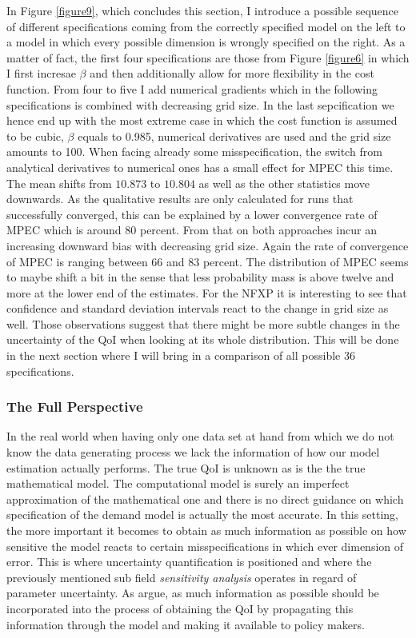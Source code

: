 In Figure \ref{figure9}, which concludes this section, I introduce a possible sequence of different specifications coming from the correctly specified model on the left to a model in which every possible dimension is wrongly specified on the right. As a matter of fact, the first four specifications are those from Figure \ref{figure6} in which I first incresae $\beta$ and then additionally allow for more flexibility in the cost function. From four to five I add numerical gradients which in the following specifications is combined with decreasing grid size. In the last sepcification we hence end up with the most extreme case in which the cost function is assumed to be cubic, $\beta$ equals to 0.985, numerical derivatives are used and the grid size amounts to 100. When facing already some misspecification, the switch from analytical derivatives to numerical ones has a small effect for MPEC this time. The mean shifts from $10.873$ to $10.804$ as well as the other statistics move downwards. As the qualitative results are only calculated for runs that successfully converged, this can be explained by a lower convergence rate of MPEC which is around 80 percent. From that on both approaches incur an increasing downward bias with decreasing grid size. Again the rate of convergence of MPEC is ranging between 66 and 83 percent. The distribution of MPEC seems to maybe shift a bit in the sense that less probability mass is above twelve and more at the lower end of the estimates. For the NFXP it is interesting to see that confidence and standard deviation intervals react to the change in grid size as well. Those observations suggest that there might be more subtle changes in the uncertainty of the QoI when looking at its whole distribution. This will be done in the next section where I will bring in a comparison of all possible 36 specifications.

\subsubsection{The Full Perspective}

In the real world when having only one data set at hand from which we do not know the data generating process we lack the information of how our model estimation actually performs. The true QoI is unknown as is the the true mathematical model. The computational model is surely an imperfect approximation of the mathematical one and there is no direct guidance on which specification of the demand model is actually the most accurate. In this setting, the more important it becomes to obtain as much information as possible on how sensitive the model reacts to certain misspecifications in which ever dimension of error. This is where uncertainty quantification is positioned and where the previously mentioned sub field \textit{sensitivity analysis} operates in regard of parameter uncertainty. As \cite{Oberkampf.2010} argue, as much information as possible should be incorporated into the process of obtaining the QoI by propagating this information through the model and making it available to policy makers.

